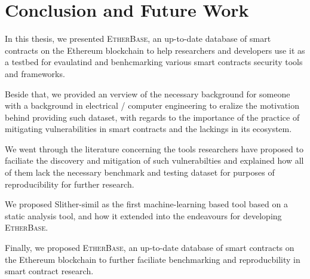 \documentclass[letterpaper,12pt,onecolumn,final]{report}
\newcommand{\etherbase}{{\scshape EtherBase\xspace}}
\begin{document}








%


\chapter{Conclusion and Future Work}
\label{chap:conclusion}

In this thesis, we presented \etherbase, an up-to-date database of smart contracts on the Ethereum blockchain to help researchers and developers use it as a testbed for evaulatind and benhcmarking various smart contracts security tools and frameworks.

Beside that, we provided an verview of the necessary background for someone with a background in electrical / computer engineering to eralize the motivation behind providing such dataset, with regards to the importance of the practice of mitigating vulnerabilities in smart contracts and the lackings in its ecosystem.

We went through the literature concerning the tools researchers have proposed to faciliate the discovery and mitigation of such vulnerabilties and explained how all of them lack the necessary benchmark and testing dataset for purposes of reproducibility for further research.

We proposed Slither-simil as the first machine-learning based tool based on a static analysis tool, and how it extended into the endeavours for developing \etherbase.

Finally, we proposed \etherbase, an up-to-date database of smart contracts on the Ethereum blockchain to further faciliate benchmarking and reproducbility in smart contract research.

\clearpage
{}
{}  %
\singlespacing %





\appendix
\setcounter{table}{0}		%
\setcounter{figure}{0}		%
\renewcommand{\thefigure}{\Alph{chapter}.\arabic{figure}} 	%
\renewcommand{\thetable}{\Alph{chapter}.\arabic{table}}		%
\end{document}
